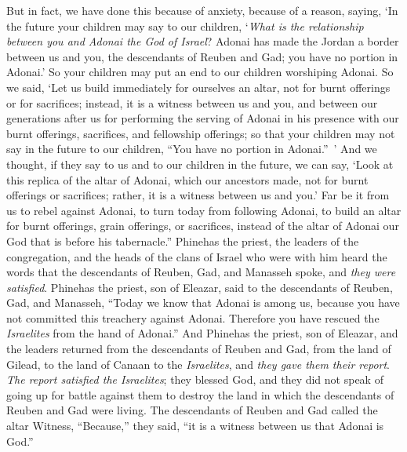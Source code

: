 \begin{biblechapter}
\verse But in fact, we have done this because of anxiety, because of a reason, saying, ‘In the future your children may say to our children, ‘\textit{What is the relationship between you and Adonai the God of Israel}?
\verse Adonai has made the Jordan a border between us and you, the descendants of Reuben and Gad; you have no portion in Adonai.’ So your children may put an end to our children worshiping Adonai.
\verse So we said, ‘Let us build immediately for ourselves an altar, not for burnt offerings or for sacrifices;
\verse instead, it is a witness between us and you, and between our generations after us for performing the serving of Adonai in his presence with our burnt offerings, sacrifices, and fellowship offerings; so that your children may not say in the future to our children, “You have no portion in Adonai.” ’
\verse And we thought, if they say to us and to our children in the future, we can say, ‘Look at this replica of the altar of Adonai, which our ancestors made, not for burnt offerings or sacrifices; rather, it is a witness between us and you.’
\verse Far be it from us to rebel against Adonai, to turn today from following Adonai, to build an altar for burnt offerings, grain offerings, or sacrifices, instead of the altar of Adonai our God that is before his tabernacle.”
\verse Phinehas the priest, the leaders of the congregation, and the heads of the clans of Israel who were with him heard the words that the descendants of Reuben, Gad, and Manasseh spoke, and \textit{they were satisfied}.
\verse Phinehas the priest, son of Eleazar, said to the descendants of Reuben, Gad, and Manasseh, “Today we know that Adonai is among us, because you have not committed this treachery against Adonai. Therefore you have rescued the \textit{Israelites} from the hand of Adonai.”
\verse And Phinehas the priest, son of Eleazar, and the leaders returned from the descendants of Reuben and Gad, from the land of Gilead, to the land of Canaan to the \textit{Israelites}, and \textit{they gave them their report}.
\verse \textit{The report satisfied the Israelites}; they blessed God, and they did not speak of going up for battle against them to destroy the land in which the descendants of Reuben and Gad were living.
\verse The descendants of Reuben and Gad called the altar Witness, “Because,” they said, “it is a witness between us that Adonai is God.”
\end{biblechapter}

